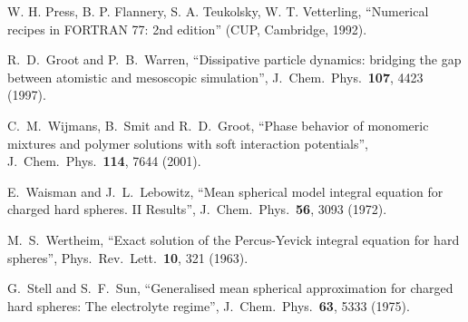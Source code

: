\documentclass[12pt,a4paper]{article}
\begin{document}
 W. H. Press, B. P. Flannery, S. A. Teukolsky,
  W. T. Vetterling, ``Numerical recipes in FORTRAN 77: 2nd edition''
  (CUP, Cambridge, 1992).

 R.~D.~Groot and P.~B.~Warren, ``Dissipative particle
  dynamics: bridging the gap between atomistic and mesoscopic
  simulation'', J.\ Chem.\ Phys.\ {\bf107}, 4423 (1997).

 C.~M.~Wijmans, B.~Smit and R.~D.~Groot, ``Phase
  behavior of monomeric mixtures and polymer solutions with soft
  interaction potentials'', J.\ Chem.\ Phys.\ {\bf114}, 7644 (2001).

 E.~Waisman and J.~L.~Lebowitz, ``Mean spherical model
  integral equation for charged hard spheres. II Results'',
  J.\ Chem.\ Phys.\ {\bf56}, 3093 (1972).

 M.~S.~Wertheim, ``Exact solution of the Percus-Yevick
  integral equation for hard spheres'', Phys.\ Rev.\ Lett.\ {\bf10},
  321 (1963).

 G.~Stell and S.~F.~Sun, ``Generalised mean spherical
  approximation for charged hard spheres: The electrolyte regime'',
  J.\ Chem.\ Phys.\ {\bf63}, 5333 (1975).
\end{document}
